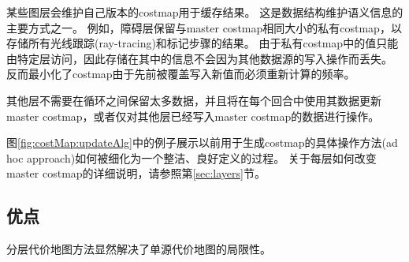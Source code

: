 某些图层会维护自己版本的costmap用于缓存结果。 这是数据结构维护语义信息的主要方式之一。 例如，障碍层保留与master costmap相同大小的私有costmap，以存储所有光线跟踪(ray-tracing)和标记步骤的结果。 由于私有costmap中的值只能由特定层访问，因此存储在其中的信息不会因为其他数据源的写入操作而丢失。 
反而最小化了costmap由于先前被覆盖写入新值而必须重新计算的频率。

其他层不需要在循环之间保留太多数据，并且将在每个回合中使用其数据更新master costmap，或者仅对其他层已经写入master costmap的数据进行操作。


图\ref{fig:costMap:updateAlg}中的例子展示以前用于生成costmap的具体操作方法(ad hoc approach)如何被细化为一个整洁、良好定义的过程。 
关于每层如何改变master costmap的详细说明，请参照第\ref{sec:layers}节。


\subsection{优点}
分层代价地图方法显然解决了单源代价地图的局限性。

